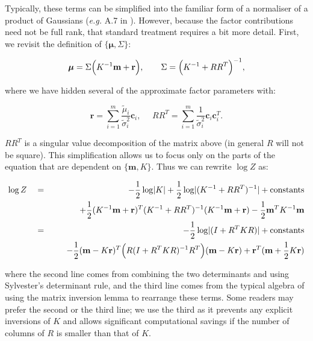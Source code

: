 \documentclass[twoside,11pt]{article}
\def\c{{\mathbf c}}
\def\r{{\mathbf r}}
\def\m{{\mathbf m}}
\def\boldmu{\bm{\mu}}
\begin{document}
Typically, these terms can be simplified into the familiar form of a normaliser of a product of Gaussians ({\it e.g.} A.7 in \cite{rasmussenBook}).   However, because the factor contributions need not be full rank, that standard treatment requires a bit more detail.  First, we revisit the definition of $\{\boldmu, \Sigma\}$:

\begin{equation}
\boldmu  =
\Sigma\Bigl(K^{-1}\m + \r \Bigr),
~~~~~~\Sigma = \Bigl(K^{-1} + RR^T \Bigr)^{-1},
\end{equation}

\noindent where we have hidden several of the approximate factor parameters with:

\begin{equation}
\label{eqn:bterms}
\r  = \overset{m}{\sum_{i=1}}\frac{\tilde{\mu}_i}{\tilde{\sigma}^2_i}\c_i,
~~~~~~
RR^T = \overset{m}{\sum_{i=1}} \frac{1}{\tilde{\sigma}^2_i}\c_i\c_i^T.
\end{equation}

\noindent $RR^T$ is a singular value decomposition of the matrix above (in general $R$ will not be square).  This simplification allows us to focus only on the parts of the equation that are dependent on $\{\m,K\}$.  Thus we can rewrite $\log Z$ as:

\begin{eqnarray}
\label{eqn:dlogZ2}
\log Z  ~~~&=&~~~ 
-\frac{1}{2}\log\lvert K \rvert 
+ \frac{1}{2}\log\lvert (K^{-1} + RR^T)^{-1} \rvert + \mathrm{constants}
\\ && ~~~~~
+ \frac{1}{2}(K^{-1}\m + \r)^T(K^{-1} + RR^T)^{-1}(K^{-1}\m + \r)
-\frac{1}{2}\m^TK^{-1}\m
\nonumber
\\
~~~& = & ~~~
-\frac{1}{2}\log\lvert (I + R^TKR) \rvert + \mathrm{constants}
\\ && ~~~~~
-\frac{1}{2} (\m -K\r)^T\Bigl(R(I + R^TKR)^{-1}R^T\Bigr)(\m - K\r) + \r^T(\m + \frac{1}{2}K\r)
\nonumber
\end{eqnarray}

\noindent where the second line comes from combining the two determinants and using Sylvester's determinant rule, and the third line comes from the typical algebra of using the matrix inversion lemma to rearrange these terms.  Some readers may prefer the second or the third line;  we use the third as it prevents any explicit inversions of $K$ and allows significant computational savings if the number of columns of $R$ is smaller than that of $K$.
\end{document}
